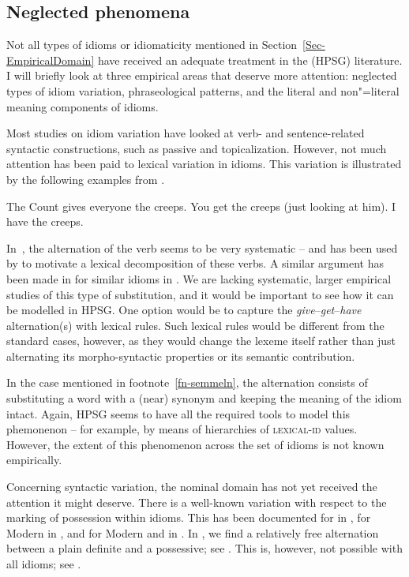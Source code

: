 \documentclass[output=paper
	        ,collection
	        ,collectionchapter
 	        ,biblatex
                ,babelshorthands
                ,newtxmath
                ,draftmode
                ,colorlinks, citecolor=brown
]{langscibook}
\begin{document}
\subsection{Neglected phenomena}
\label{Sec-Neglected}

Not all types of idioms or idiomaticity mentioned in Section~\ref{Sec-EmpiricalDomain} have received an adequate treatment in the (HPSG) literature.
I will briefly look at three empirical areas that deserve more attention: neglected types of idiom variation, phraseological patterns, and the literal and non"=literal meaning components of idioms.

Most studies on idiom variation have looked at verb- and sentence-related syntactic constructions, such as passive and topicalization. 
However, not much attention has been paid to lexical variation in idioms. This variation is illustrated by the following examples from \citet[, 191]{Richards:01}. 

\eal  \label{creeps}
\ex The Count gives everyone the creeps.
\ex You get the creeps (just looking at him).
\ex I have the creeps.
\zl 

In~, the alternation of the verb seems to be very systematic -- and has been used by \citet{Richards:01} to motivate a lexical decomposition of these verbs.
A similar argument has been made in \citet{Mateu:Espinal:07} for similar idioms in . 
We are lacking systematic, larger empirical studies of this type of substitution, and it would be important to see how it can be modelled in HPSG. 
One option would be to capture the \emph{give}--\emph{get}--\emph{have} alternation(s) with lexical rules. Such lexical rules would be different from the standard cases, however, as they would change the lexeme itself rather than just alternating its morpho-syntactic properties or its semantic contribution.

In the case mentioned in footnote~\ref{fn-semmeln}, the alternation consists of substituting a word with a (near) synonym and keeping the meaning of the idiom intact. Again, HPSG seems to have all the required tools to model this phemonenon -- for example, by means of hierarchies of \textsc{lexical-id} values. 
However, the extent of this phenomenon across the set of idioms is not known empirically. 

Concerning syntactic variation, the nominal domain has not yet received the attention it might deserve. 
There is a well-known variation with respect to the marking of possession within idioms. 
This has been documented for  in \citet{Ho:15}, for Modern  in \citet{Almog:12}, and for Modern  and  in \citet{Markantonatou:Sailer:16}. 
In , we find a relatively free alternation between a plain definite and a possessive; see . This is, however, not possible with all idioms; see  .
\end{document}
